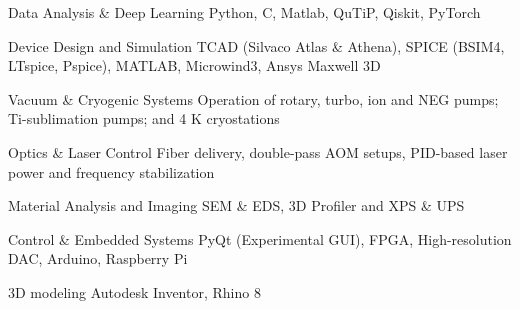 

\begin{cvskills}

  \cvskill
    {Data Analysis \& Deep Learning}
    {Python, C, Matlab, QuTiP, Qiskit, PyTorch}

  \cvskill
    {Device Design and Simulation}
    {TCAD (Silvaco Atlas \& Athena), SPICE (BSIM4, LTspice, Pspice), MATLAB, Microwind3, Ansys Maxwell 3D}

  \cvskill
    {Vacuum \& Cryogenic Systems}
    {Operation of rotary, turbo, ion and NEG pumps; Ti-sublimation pumps; and 4 K cryostations}

  \cvskill
    {Optics \& Laser Control}
    {Fiber delivery, double-pass AOM setups, PID-based laser power and frequency stabilization}

  \cvskill
    {Material Analysis and Imaging}
    {SEM \& EDS, 3D Profiler and XPS \& UPS}

  \cvskill
    {Control \& Embedded Systems}
    {PyQt (Experimental GUI), FPGA, High-resolution DAC, Arduino, Raspberry Pi}

  \cvskill
    {3D modeling}
    {Autodesk Inventor, Rhino 8}
\end{cvskills}
